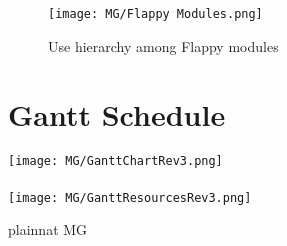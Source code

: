 \documentclass[12pt, titlepage]{article}
\begin{document}
\begin{figure}[H]
\centering
\texttt{[image: MG/Flappy Modules.png]}
\caption{Use hierarchy among Flappy modules}
\label{FigUHF}
\end{figure}

\newpage 

\section{Gantt Schedule} \label{SeCSched}
\texttt{[image: MG/GanttChartRev3.png]}\\
\\
\texttt{[image: MG/GanttResourcesRev3.png]}



 {plainnat}
 {MG}
\end{document}
